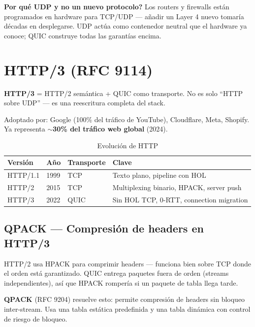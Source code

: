 \begin{cuidado}
\textbf{Por qué UDP y no un nuevo protocolo?} Los routers y firewalls están
programados en hardware para TCP/UDP --- añadir un Layer 4 nuevo tomaría
décadas en desplegarse. UDP actúa como contenedor neutral que el hardware
ya conoce; QUIC construye todas las garantías encima.
\end{cuidado}

\section{ HTTP/3 (RFC 9114)}

\begin{concepto}
\textbf{HTTP/3} = HTTP/2 semántica + QUIC como transporte. No es solo
``HTTP sobre UDP'' --- es una reescritura completa del stack.

Adoptado por: Google (100\% del tráfico de YouTube), Cloudflare, Meta,
Shopify. Ya representa \textbf{$\sim$30\% del tráfico web global} (2024).
\end{concepto}

\begin{table}[h!]
\centering
\renewcommand{\arraystretch}{1.3}
\begin{tabular}{llll}
\toprule
\textbf{Versión} & \textbf{Año} & \textbf{Transporte} & \textbf{Clave} \\
\midrule
HTTP/1.1 & 1999 & TCP  & Texto plano, pipeline con HOL \\
HTTP/2   & 2015 & TCP  & Multiplexing binario, HPACK, server push \\
HTTP/3   & 2022 & QUIC & Sin HOL TCP, 0-RTT, connection migration \\
\bottomrule
\end{tabular}
\caption{Evolución de HTTP}
\end{table}

\subsection{QPACK --- Compresión de headers en HTTP/3}

HTTP/2 usa HPACK para comprimir headers --- funciona bien sobre TCP donde
el orden está garantizado. QUIC entrega paquetes fuera de orden (streams
independientes), así que HPACK rompería si un paquete de tabla llega tarde.

\textbf{QPACK} (RFC 9204) resuelve esto: permite compresión de headers
sin bloqueo inter-stream. Usa una tabla estática predefinida y una tabla
dinámica con control de riesgo de bloqueo.

